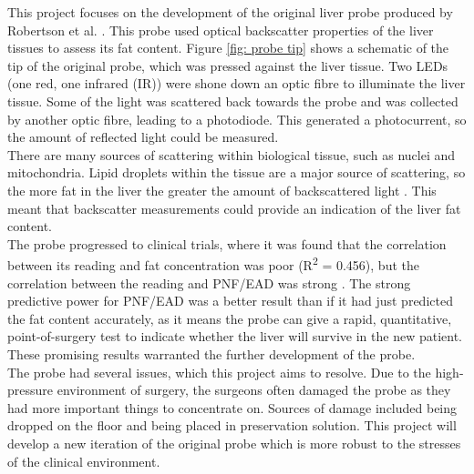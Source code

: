 This project focuses on the development of the original liver probe produced by Robertson et al. \cite{Robertson}. This probe used optical backscatter properties of the liver tissues to assess its fat content. Figure \ref{fig: probe tip} shows a schematic of the tip of the original probe, which was pressed against the liver tissue. Two LEDs (one red, one infrared (IR)) were shone down an optic fibre to illuminate the liver tissue. Some of the light was scattered back towards the probe and was collected by another optic fibre, leading to a photodiode. This generated a photocurrent, so the amount of reflected light could be measured. \\

There are many sources of scattering within biological tissue, such as nuclei and mitochondria. Lipid droplets within the tissue are a major source of scattering, so the more fat in the liver the greater the amount of backscattered light \cite{McLaughlin}. This meant that backscatter measurements could provide an indication of the liver fat content.\\

The probe progressed to clinical trials, where it was found that the correlation between its reading and fat concentration was poor (R\textsuperscript{2} = 0.456), but the correlation between the reading and PNF/EAD was strong \cite{Robertson}. The strong predictive power for PNF/EAD was a better result than if it had just predicted the fat content accurately, as it means the probe can give a rapid, quantitative, point-of-surgery test to indicate whether the liver will survive in the new patient. These promising results warranted the further development of the probe.\\

The probe had several issues, which this project aims to resolve. Due to the high-pressure environment of surgery, the surgeons often damaged the probe as they had more important things to concentrate on. Sources of damage included being dropped on the floor and being placed in preservation solution. This project will develop a new iteration of the original probe which is more robust to the stresses of the clinical environment.\\




